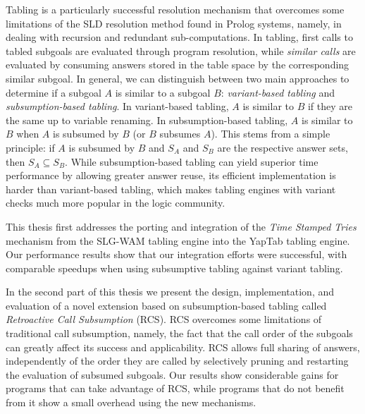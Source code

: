 Tabling is a particularly successful resolution mechanism that overcomes some limitations
of the SLD resolution method found in Prolog systems, namely, in dealing with recursion and redundant
sub-computations. In tabling, first calls to tabled subgoals are evaluated through
program resolution, while \emph{similar calls} are evaluated by consuming answers stored
in the table space by the corresponding similar subgoal.
In general, we can distinguish between two main approaches to determine if a subgoal $A$ is
similar to a subgoal $B$: \emph{variant-based tabling} and \emph{subsumption-based tabling}.
In variant-based tabling, $A$ is similar to $B$ if they are the same
up to variable renaming. In subsumption-based tabling, $A$ is similar to $B$ when $A$ is subsumed
by $B$ (or $B$ subsumes $A$). This stems from a simple principle: if $A$ is subsumed by $B$ and
$S_A$ and $S_B$ are the respective answer sets, then $S_A \subseteq S_B$.
While subsumption-based tabling can yield superior time performance by allowing greater answer
reuse, its efficient implementation is harder than variant-based tabling, which makes tabling engines
with variant checks much more popular in the logic community.

This thesis first addresses the porting and integration of the \emph{Time Stamped Tries} mechanism
from the SLG-WAM tabling engine into the YapTab tabling engine. Our performance results show that our
integration efforts were successful, with comparable speedups when using subsumptive tabling against
variant tabling.

In the second part of this thesis we present the design, implementation, and evaluation of a novel extension
based on subsumption-based tabling called \emph{Retroactive Call Subsumption} (RCS). RCS overcomes some limitations
of traditional call subsumption, namely, the fact that the call order of the subgoals can greatly affect its
success and applicability. RCS allows full sharing of answers,
independently of the order they are called by selectively pruning and restarting the evaluation of subsumed
subgoals. Our results show considerable gains for programs that can take advantage of RCS, while programs
that do not benefit from it show a small overhead using the new mechanisms.
